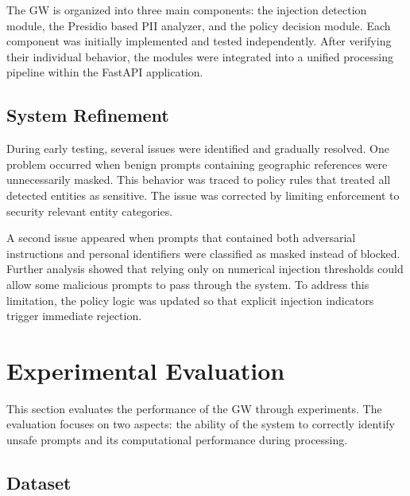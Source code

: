 \documentclass[conference]{IEEEtran}
\begin{document}
The GW is organized into three main components: the injection detection module, the Presidio based PII analyzer, and the policy decision module. Each component was initially implemented and tested independently. After verifying their individual behavior, the modules were integrated into a unified processing pipeline within the FastAPI application.

\subsection{System Refinement}

During early testing, several issues were identified and gradually resolved. One problem occurred when benign prompts containing geographic references were unnecessarily masked. This behavior was traced to policy rules that treated all detected entities as sensitive. The issue was corrected by limiting enforcement to security relevant entity categories.

A second issue appeared when prompts that contained both adversarial instructions and personal identifiers were classified as masked instead of blocked. Further analysis showed that relying only on numerical injection thresholds could allow some malicious prompts to pass through the system. To address this limitation, the policy logic was updated so that explicit injection indicators trigger immediate rejection.



\section{Experimental Evaluation}
\label{sec:eval}

This section evaluates the performance of the GW through experiments. The evaluation focuses on two aspects: the ability of the system to correctly identify unsafe prompts and its computational performance during processing.

\subsection{Dataset}
\end{document}
